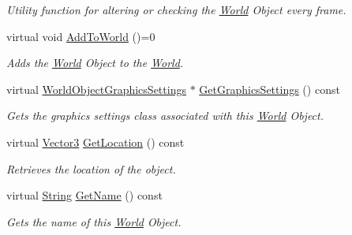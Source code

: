 \begin{DoxyCompactItemize}
\begin{DoxyCompactList}\small\item\em Utility function for altering or checking the \hyperlink{classMezzanine_1_1World}{World} Object every frame. \item\end{DoxyCompactList}\item 
\hypertarget{classMezzanine_1_1WorldObject_a73f51f4025bfbb1f86075de45d33d10a}{
virtual void \hyperlink{classMezzanine_1_1WorldObject_a73f51f4025bfbb1f86075de45d33d10a}{AddToWorld} ()=0}
\label{classMezzanine_1_1WorldObject_a73f51f4025bfbb1f86075de45d33d10a}

\begin{DoxyCompactList}\small\item\em Adds the \hyperlink{classMezzanine_1_1World}{World} Object to the \hyperlink{classMezzanine_1_1World}{World}. \item\end{DoxyCompactList}\item 
virtual \hyperlink{classMezzanine_1_1WorldObjectGraphicsSettings}{WorldObjectGraphicsSettings} $\ast$ \hyperlink{classMezzanine_1_1WorldObject_a7ce5266a3f5a31a3528f6fdba043aa0e}{GetGraphicsSettings} () const 
\begin{DoxyCompactList}\small\item\em Gets the graphics settings class associated with this \hyperlink{classMezzanine_1_1World}{World} Object. \item\end{DoxyCompactList}\item 
virtual \hyperlink{classMezzanine_1_1Vector3}{Vector3} \hyperlink{classMezzanine_1_1WorldObject_a66d040856234ceacfbba2532047ee9cb}{GetLocation} () const 
\begin{DoxyCompactList}\small\item\em Retrieves the location of the object. \item\end{DoxyCompactList}\item 
virtual \hyperlink{namespaceMezzanine_acf9fcc130e6ebf08e3d8491aebcf1c86}{String} \hyperlink{classMezzanine_1_1WorldObject_a656f70caf8003cf7d47fdd3ac024efe2}{GetName} () const 
\begin{DoxyCompactList}\small\item\em Gets the name of this \hyperlink{classMezzanine_1_1World}{World} Object. \item\end{DoxyCompactList}\item 

\end{DoxyCompactItemize}
